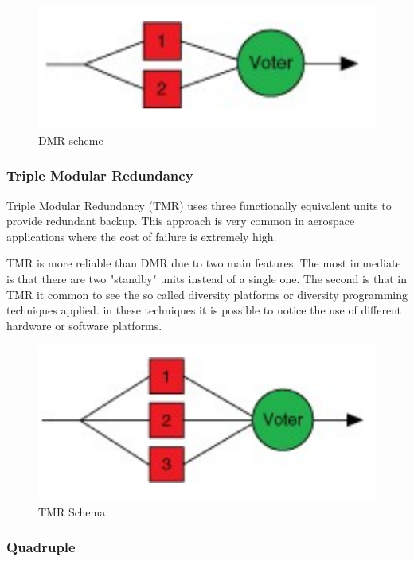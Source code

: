 \documentclass[./dissertation.tex]{subfiles}
\begin{document}
\begin{figure}
\centering
  \includegraphics[scale = 0.50]{imgs/dred.png}
  \caption{DMR scheme}
  \label{fig:dred}
\end{figure}

\subsubsection{Triple Modular Redundancy}
Triple Modular Redundancy (TMR) uses three functionally equivalent units to provide redundant backup. This approach is very common in aerospace applications where the cost of failure is extremely high.

TMR is more reliable than DMR due to two main features. The most immediate is that there are two "standby" units instead of a single one. The second is that in TMR it common to see the so called diversity platforms or diversity programming techniques applied. in these techniques it is possible to notice the use of different hardware or software platforms. 

\begin{figure}[h!]
\centering
  \includegraphics[scale = 0.50]{imgs/tred.png}
  \caption{TMR Schema}
  \label{fig:tred}
\end{figure}

\subsubsection{Quadruple}
\end{document}
